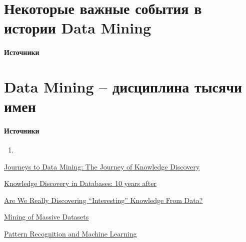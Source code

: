 \documentclass[10pt,a4paper]{article}
\begin{document}

\section{Некоторые важные события в истории Data Mining}

\paragraph{Источники} \cite{journeys}


\section{Data Mining -- дисциплина тысячи имен}

\paragraph{Источники} \cite{journeys}

\begin{enumerate}
\item 
\end{enumerate}


\begin{thebibliography}{10} 

 \href{http://citeseerx.ist.psu.edu/viewdoc/download?doi=10.1.1.363.1177&rep=rep1&type=pdf}{Journeys to Data Mining: The Journey of Knowledge Discovery}

 \href{http://www.kdnuggets.com/gpspubs/sigkdd-explorations-kdd-10-years.html}{Knowledge Discovery in Databases: 10 years after}

 \href{http://www.pantaneto.co.uk/issue30/Freitas.htm}{Are We Really Discovering ``Interesting'' Knowledge From Data?}

 \href{http://infolab.stanford.edu/~ullman/mmds/book.pdf}{Mining of Massive Datasets}

 \href{http://www.rmki.kfki.hu/~banmi/elte/Bishop\%20-\%20Pattern\%20Recognition\%20and\%20Machine\%20Learning.pdf}{Pattern Recognition and Machine Learning}


\end{thebibliography}
\end{document}
